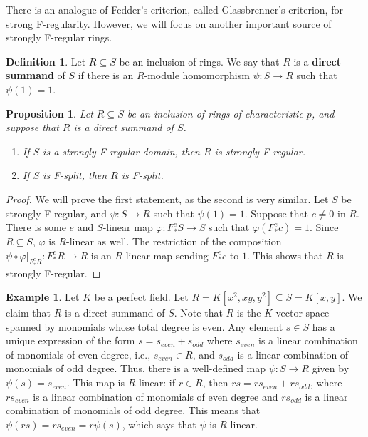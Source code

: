 \documentclass[12pt]{amsart}
\newtheorem{proposition}[theorem]{Proposition}
\theoremstyle{definition}
\newtheorem{definition}[theorem]{Definition}
\newtheorem{example}[theorem]{Example}
\numberwithin{equation}{theorem}
\def\phi{\varphi}
\def\to{\longrightarrow}
\begin{document}
There is an analogue of Fedder's criterion, called Glassbrenner's criterion, for strong F-regularity. However, we will focus on another important source of strongly F-regular rings.

\begin{definition} Let $R\subseteq S$ be an inclusion of rings. We say that $R$ is a \textbf{direct summand} of $S$ if there is an $R$-module homomorphism $\psi:S \to R$ such that $\psi(1) = 1$.
\end{definition}


\begin{proposition}
Let $R\subseteq S$ be an inclusion of rings of characteristic $p$, and suppose that $R$ is a direct summand of $S$.
\begin{enumerate}
\item If $S$ is a strongly F-regular domain, then $R$ is strongly F-regular.
\item  If $S$ is F-split, then $R$ is F-split.
\end{enumerate}
\end{proposition}
\begin{proof}
We will prove the first statement, as the second is very similar. Let $S$ be strongly F-regular, and $\psi:S\to R$ such that $\psi(1)=1$. Suppose that $c\neq 0$ in $R$. There is some $e$ and $S$-linear map $\phi:F^e_* S \to S$ such that $\phi(F^e_* c) = 1$. Since $R\subseteq S$, $\phi$ is $R$-linear as well. The restriction of the composition $\psi \circ \phi|_{F^e_* R}: F^e_*R \to R$ is an $R$-linear map sending $F^e_*c$ to $1$. This shows that $R$ is strongly F-regular.
\end{proof}

\begin{example}
Let $K$ be a perfect field. Let $R=K[x^2,xy,y^2]\subseteq S=K[x,y]$. We claim that $R$ is a direct summand of $S$. Note that $R$ is the $K$-vector space spanned by monomials whose total degree is even. Any element $s\in S$ has a unique expression of the form $s=s_{even} + s_{odd}$ where $s_{even}$ is a linear combination of monomials of even degree, i.e., $s_{even}\in R$, and $s_{odd}$ is a linear combination of monomials of odd degree. Thus, there is a well-defined map $\psi:S\to R$ given by $\psi(s)=s_{even}$. This map is $R$-linear:
if $r\in R$, then $rs = r s_{even}+ r s_{odd}$, where $ r s_{even}$  is a linear combination of monomials of even degree and $ r s_{odd}$ is a linear combination of monomials of odd degree. This means that $\psi(rs) = r s_{even} = r \psi(s)$, which says that $\psi$ is $R$-linear.
\end{example}
\end{document}
